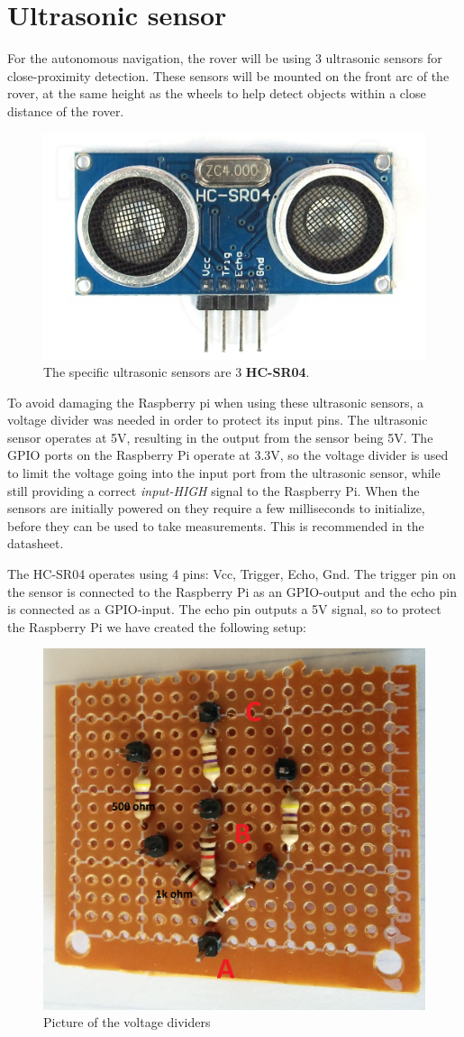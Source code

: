 \clearpage
\section{Ultrasonic sensor}

For the autonomous navigation, the rover will be using 3 ultrasonic sensors for close-proximity detection. These sensors will be mounted on the front arc of the rover, at the same height as the wheels to help detect objects within a close distance of the rover.

\begin{figure}[H]
	\centering
	\includegraphics[width=.3\linewidth]{images/hcsr40.jpg}
	\caption{The specific ultrasonic sensors are 3 \textbf{HC-SR04}.}
	\label{fig:ultrasonic_pic}
\end{figure}

To avoid damaging the Raspberry pi when using these ultrasonic sensors, a voltage divider was needed in order to protect its input pins. The ultrasonic sensor operates at 5V, resulting in the output from the sensor being 5V. The GPIO ports on the Raspberry Pi operate at 3.3V, so the voltage divider is used to limit the voltage going into the input port from the ultrasonic sensor, while still providing a correct \textit{input-HIGH} signal to the Raspberry Pi.
When the sensors are initially powered on they require a few milliseconds to initialize, before they can be used to take measurements. This is recommended in the datasheet\cite{hcsr40datesheet}.


The HC-SR04 operates using 4 pins: Vcc, Trigger, Echo, Gnd.
The trigger pin on the sensor is connected to the Raspberry Pi as an GPIO-output and the echo pin is connected as a GPIO-input. The echo pin outputs a 5V signal, so to protect the Raspberry Pi we have created the following setup:

\begin{figure}[H]
	\centering
	\includegraphics[width=.3\linewidth]{images/vd_labelled.jpg}
	\caption{Picture of the voltage dividers}
	\label{fig:voltagedividers}
\end{figure}

